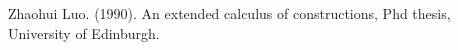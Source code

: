 \begin{thebibliography}{99}

 Zhaohui Luo. (1990). An extended calculus of constructions,
  Phd thesis, University of Edinburgh.

\end{thebibliography}


